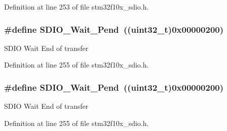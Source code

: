 Definition at line 253 of file stm32f10x\+\_\+sdio.\+h.

\subsubsection[{\texorpdfstring{S\+D\+I\+O\+\_\+\+Wait\+\_\+\+Pend}{SDIO_Wait_Pend}}]{\setlength{\rightskip}{0pt plus 5cm}\#define S\+D\+I\+O\+\_\+\+Wait\+\_\+\+Pend~(({\bf uint32\+\_\+t})0x00000200)}\hypertarget{group___s_d_i_o___wait___interrupt___state_ga2a4104023a7f8403ddd159ec3bbb8592}{}\label{group___s_d_i_o___wait___interrupt___state_ga2a4104023a7f8403ddd159ec3bbb8592}
S\+D\+IO Wait End of transfer 

Definition at line 255 of file stm32f10x\+\_\+sdio.\+h.

\subsubsection[{\texorpdfstring{S\+D\+I\+O\+\_\+\+Wait\+\_\+\+Pend}{SDIO_Wait_Pend}}]{\setlength{\rightskip}{0pt plus 5cm}\#define S\+D\+I\+O\+\_\+\+Wait\+\_\+\+Pend~(({\bf uint32\+\_\+t})0x00000200)}\hypertarget{group___s_d_i_o___wait___interrupt___state_ga2a4104023a7f8403ddd159ec3bbb8592}{}\label{group___s_d_i_o___wait___interrupt___state_ga2a4104023a7f8403ddd159ec3bbb8592}
S\+D\+IO Wait End of transfer 

Definition at line 255 of file stm32f10x\+\_\+sdio.\+h.

